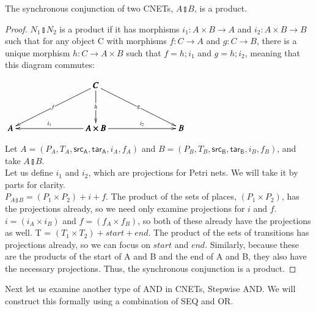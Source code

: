 \begin{lemma}
\label{lemma:SYNC-AND-PRODUCT}
The synchronous conjunction of two CNETs, $A \talloblong B$, is a product.
\end{lemma}
\begin{proof}
$N_1 \talloblong N_2$ is a product if it has morphisms $i_1: A \times B \to A$ and $i_2: A \times B \to B$ such that for any object C with morphisms $f: C\to A$ and $g: C\to B$, there is a unique morphism $h: C \to A \times B$ such that $f =h; i_1$ and $g = h;i_2$, meaning that this diagram commutes:\\
\begin{center}
  \begin{math}
    \bfig
    \Atrianglepair|mmmaa|/->`->`->`<-`->/<1000,500>[
      C`
      A`
      A\times B`
      B;
      f`
      h`
      g`
      i_1`
      i_2]
    \efig
  \end{math}
\end{center}
Let $A = (P_A, T_A, \mathsf{src_A}, \mathsf{tar_A}, i_A, f_A)$ and $B = (P_B, T_B, \mathsf{src_B}, \mathsf{tar_B}, i_B, f_B)$, and take $A \talloblong B$.\\
Let us define $i_1$ and $i_2$, which are projections for Petri nets. We will take it by parts for clarity.\\
$P_{A \talloblong B} = (P_1 \times P_2) + i + f$. The product of the sets of places, $(P_1 \times P_2)$, has the projections already, so we need only examine projections for $i$ and $f$. $i =  (i_A \times i_B)$ and $f =  (f_A \times f_B)$, so both of these already have the projections as well.
T = $(T_1 \times T_2) + start + end$. The product of the sets of transitions has projections already, so we can focus on $start$ and $end$. Similarly, because these are the products of the start of A and B and the end of A and B, they also have the necessary projections. Thus, the synchronous conjunction is a product.
\end{proof} 
\begin{example}
  \label{ex:STEP-AND-PN}
Next let us examine another type of AND in CNETs, Stepwise AND. We will construct this formally using a combination of SEQ and OR.
\end{example}
